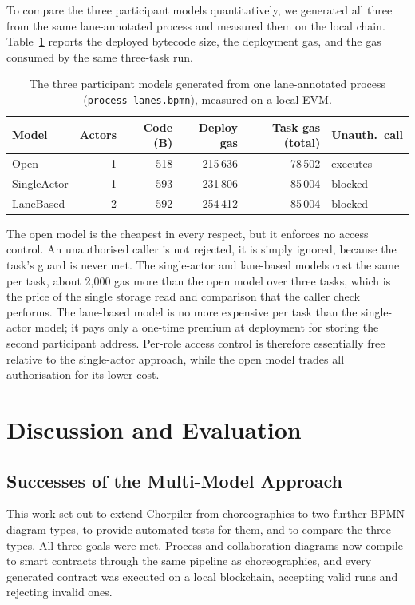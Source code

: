 \documentclass[runningheads]{llncs}
\begin{document}
To compare the three participant models quantitatively, we generated all three from the same lane-annotated process and measured them on the local chain. Table~\ref{tab:gas} reports the deployed bytecode size, the deployment gas, and the gas consumed by the same three-task run.

\begin{table}[t]
\centering
\caption{The three participant models generated from one lane-annotated process
(\texttt{process-lanes.bpmn}), measured on a local EVM.}
\label{tab:gas}
\begin{tabular}{@{}lrrrrl@{}}
\toprule
\textbf{Model} & \textbf{Actors} & \textbf{Code (B)} & \textbf{Deploy gas} &
\textbf{Task gas (total)} & \textbf{Unauth.\ call} \\
\midrule
Open        & 1 & 518 & 215\,636 & 78\,502 & executes \\
SingleActor & 1 & 593 & 231\,806 & 85\,004 & blocked \\
LaneBased   & 2 & 592 & 254\,412 & 85\,004 & blocked \\
\bottomrule
\end{tabular}
\end{table}

The open model is the cheapest in every respect, but it enforces no access control. An unauthorised caller is not rejected, it is simply ignored, because the task's guard is never met. The single-actor and lane-based models cost the same per task, about 2{,}000 gas more than the open model over three tasks, which is the price of the single storage read and comparison that the caller check performs. The lane-based model is no more expensive per task than the single-actor model; it pays only a one-time premium at deployment for storing the second participant address. Per-role access control is therefore essentially free relative to the single-actor approach, while the open model trades all authorisation for its lower cost.

\section{Discussion and Evaluation}
\label{sec:discussion}

\subsection{Successes of the Multi-Model Approach}
This work set out to extend Chorpiler from choreographies to two further BPMN diagram types, to provide automated tests for them, and to compare the three types. All three goals were met. Process and collaboration diagrams now compile to smart contracts through the same pipeline as choreographies, and every generated contract was executed on a local blockchain, accepting valid runs and rejecting invalid ones.
\end{document}

